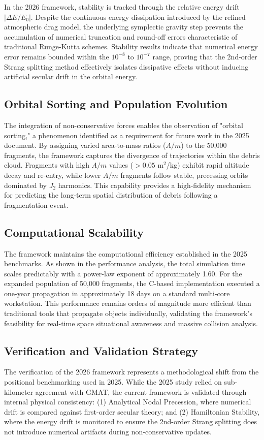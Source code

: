 \documentclass[letterpaper,11pt]{AAS}
\begin{document}
In the 2026 framework, stability is tracked through the relative energy drift $|\Delta E / E_0|$. Despite the continuous energy dissipation introduced by the refined atmospheric drag model, the underlying symplectic gravity step prevents the accumulation of numerical truncation and round-off errors characteristic of traditional Runge-Kutta schemes. Stability results indicate that numerical energy error remains bounded within the $10^{-8}$ to $10^{-7}$ range, proving that the 2nd-order Strang splitting method effectively isolates dissipative effects without inducing artificial secular drift in the orbital energy.

\subsection{Orbital Sorting and Population Evolution}
The integration of non-conservative forces enables the observation of "orbital sorting," a phenomenon identified as a requirement for future work in the 2025 document. By assigning varied area-to-mass ratios ($A/m$) to the 50,000 fragments, the framework captures the divergence of trajectories within the debris cloud. Fragments with high $A/m$ values ($>0.05$ m$^2$/kg) exhibit rapid altitude decay and re-entry, while lower $A/m$ fragments follow stable, precessing orbits dominated by $J_2$ harmonics. This capability provides a high-fidelity mechanism for predicting the long-term spatial distribution of debris following a fragmentation event.

\subsection{Computational Scalability}
The framework maintains the computational efficiency established in the 2025 benchmarks. As shown in the performance analysis, the total simulation time scales predictably with a power-law exponent of approximately 1.60. For the expanded population of 50,000 fragments, the C-based implementation executed a one-year propagation in approximately 18 days on a standard multi-core workstation. This performance remains orders of magnitude more efficient than traditional tools that propagate objects individually, validating the framework's feasibility for real-time space situational awareness and massive collision analysis.

\subsection{Verification and Validation Strategy}
The verification of the 2026 framework represents a methodological shift from the positional benchmarking used in 2025. While the 2025 study relied on sub-kilometer agreement with GMAT, the current framework is validated through internal physical consistency: (1) Analytical Nodal Precession, where numerical drift is compared against first-order secular theory; and (2) Hamiltonian Stability, where the energy drift is monitored to ensure the 2nd-order Strang splitting does not introduce numerical artifacts during non-conservative updates.
\end{document}
